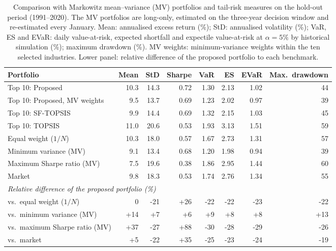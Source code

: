 \begin{table}[!htbp]
\centering
\scriptsize
\caption{Comparison with Markowitz mean--variance (MV) portfolios and tail-risk measures on the hold-out period (1991--2020). The MV portfolios are long-only, estimated on the three-year decision window and re-estimated every January. Mean: annualised excess return (\%); StD: annualised volatility (\%); VaR, ES and EVaR: daily value-at-risk, expected shortfall and expectile value-at-risk at $\alpha=5\%$ by historical simulation (\%); maximum drawdown (\%). MV weights: minimum-variance weights within the ten selected industries. Lower panel: relative difference of the proposed portfolio to each benchmark.}\label{tab:risk}
\begin{adjustbox}{max width=\textwidth}
\begin{tabular}{lrrrrrrr}
\toprule
Portfolio & Mean & StD & Sharpe & VaR & ES & EVaR & Max.\ drawdown \\
\midrule
Top 10: Proposed & 10.3 & 14.3 & 0.72 & 1.30 & 2.13 & 1.02 & 44 \\
Top 10: Proposed, MV weights & 9.5 & 13.7 & 0.69 & 1.23 & 2.02 & 0.97 & 39 \\
Top 10: SF-TOPSIS & 9.9 & 14.4 & 0.69 & 1.32 & 2.15 & 1.03 & 45 \\
Top 10: TOPSIS & 11.0 & 20.6 & 0.53 & 1.93 & 3.13 & 1.51 & 59 \\
Equal weight ($1/N$) & 10.3 & 18.0 & 0.57 & 1.67 & 2.73 & 1.31 & 57 \\
Minimum variance (MV) & 9.1 & 13.4 & 0.68 & 1.20 & 1.98 & 0.94 & 39 \\
Maximum Sharpe ratio (MV) & 7.5 & 19.6 & 0.38 & 1.86 & 2.95 & 1.44 & 60 \\
Market & 9.8 & 18.3 & 0.53 & 1.74 & 2.76 & 1.34 & 55 \\
\midrule
\multicolumn{8}{l}{\emph{Relative difference of the proposed portfolio (\%)}}\\
vs.\ equal weight ($1/N$) & 0 & -21 & +26 & -22 & -22 & -23 & -22 \\
vs.\ minimum variance (MV) & +14 & +7 & +6 & +9 & +8 & +8 & +13 \\
vs.\ maximum Sharpe ratio (MV) & +37 & -27 & +88 & -30 & -28 & -29 & -26 \\
vs.\ market & +5 & -22 & +35 & -25 & -23 & -24 & -19 \\
\bottomrule
\end{tabular}
\end{adjustbox}
\end{table}
